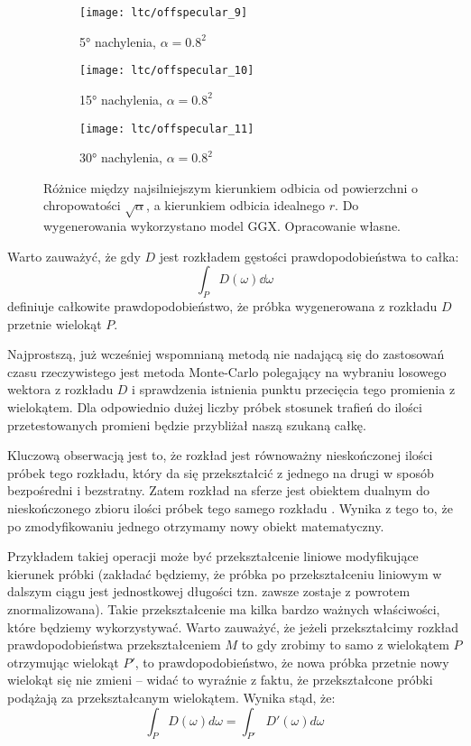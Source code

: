 \documentclass[../main.tex]{subfiles}
\begin{document}
\begin{figure}
    \begin{subfigure}[t]{0.3\textwidth}
        \centering
        \texttt{[image: ltc/offspecular\_9]}
        \caption{\ang{5} nachylenia, $\alpha = 0.8^2$}
    \end{subfigure}
    \begin{subfigure}[t]{0.3\textwidth}
        \centering
        \texttt{[image: ltc/offspecular\_10]}
        \caption{\ang{15} nachylenia, $\alpha = 0.8^2$}
    \end{subfigure}
    \begin{subfigure}[t]{0.3\textwidth}
        \centering
        \texttt{[image: ltc/offspecular\_11]}
        \caption{\ang{30} nachylenia, $\alpha = 0.8^2$}
    \end{subfigure}
    
    \caption{Różnice między najsilniejszym kierunkiem odbicia od powierzchni o chropowatości $\sqrt{\alpha}$, a kierunkiem odbicia idealnego $r$. Do wygenerowania wykorzystano model GGX. Opracowanie własne.}
    \label{fig:BRDFOffSpecular}
\end{figure}

Warto zauważyć, że gdy $D$ jest rozkładem gęstości prawdopodobieństwa to całka:
\[
\int_P {
    D(\omega)
    \dd \omega
}
\]
\noindent definiuje całkowite prawdopodobieństwo, że próbka wygenerowana z rozkładu $D$ przetnie wielokąt $P$.

Najprostszą, już wcześniej wspomnianą metodą nie nadającą się do zastosowań czasu rzeczywistego jest metoda Monte-Carlo polegający na wybraniu losowego wektora z rozkładu $D$ i sprawdzenia istnienia punktu przecięcia tego promienia z wielokątem. Dla odpowiednio dużej liczby próbek stosunek trafień do ilości przetestowanych promieni będzie przybliżał naszą szukaną całkę.

Kluczową obserwacją jest to, że rozkład jest równoważny nieskończonej ilości próbek tego rozkładu, który da się przekształcić z jednego na drugi w sposób bezpośredni i bezstratny. Zatem rozkład na sferze jest obiektem dualnym do nieskończonego zbioru ilości próbek tego samego rozkładu \cite{ltc_heitz}. Wynika z tego to, że po zmodyfikowaniu jednego otrzymamy nowy obiekt matematyczny.

Przykładem takiej operacji może być przekształcenie liniowe modyfikujące kierunek próbki (zakładać będziemy, że próbka po przekształceniu liniowym w dalszym ciągu jest jednostkowej długości tzn. zawsze zostaje z powrotem znormalizowana). Takie przekształcenie ma kilka bardzo ważnych właściwości, które będziemy wykorzystywać. Warto zauważyć, że jeżeli przekształcimy rozkład prawdopodobieństwa przekształceniem $M$ to gdy zrobimy to samo z wielokątem $P$ otrzymując wielokąt $P'$, to prawdopodobieństwo, że nowa próbka przetnie nowy wielokąt się nie zmieni – widać to wyraźnie z faktu, że przekształcone próbki podążają za przekształcanym wielokątem. Wynika stąd, że:
\[
\int_P {
  D(\omega)
  d \omega
} = \int_{P'} {
  D'(\omega)
  d\omega
}
\]
\end{document}
